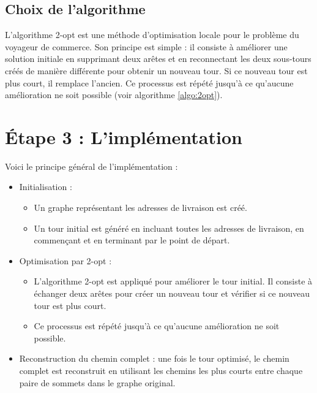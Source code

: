\documentclass{article}
\begin{document}
\subsection{Choix de l’algorithme}

L'algorithme 2-opt est une méthode d'optimisation locale pour le problème du voyageur de commerce.
Son principe est simple : il consiste à améliorer une solution initiale en supprimant deux arêtes et en reconnectant les deux sous-tours créés de manière différente pour obtenir un nouveau tour.
Si ce nouveau tour est plus court, il remplace l'ancien. Ce processus est répété jusqu'à ce qu'aucune amélioration ne soit possible (voir algorithme \ref{algo:2opt}).

\section{Étape 3 : L'implémentation} 

Voici le principe général de l'implémentation :

\begin{itemize}
    \item Initialisation : 
    \begin{itemize}
        \item Un graphe représentant les adresses de livraison est créé.
        \item Un tour initial est généré en incluant toutes les adresses de livraison, en commençant et en terminant par le point de départ.
    \end{itemize}
    \item Optimisation par 2-opt :
    \begin{itemize}
        \item L'algorithme 2-opt est appliqué pour améliorer le tour initial. Il consiste à échanger deux arêtes pour créer un nouveau tour et vérifier si ce nouveau tour est plus court.
       \item  Ce processus est répété jusqu'à ce qu'aucune amélioration ne soit possible.
    \end{itemize}
    \item Reconstruction du chemin complet : une fois le tour optimisé, le chemin complet est reconstruit en utilisant les chemins les plus courts entre chaque paire de sommets dans le graphe original.
\end{itemize}
\end{document}
